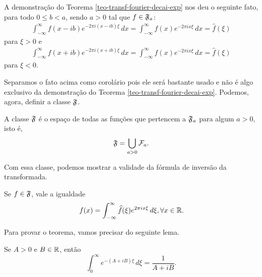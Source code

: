         \begin{corolario}
        \label{transf-fourier-inv-por-shift}
            A demonstração do Teorema \ref{teo-transf-fourier-decai-exp} nos deu o seguinte fato,
            para todo $0\leq b < a$, sendo $a > 0$ tal que $f\in\mathfrak{F}_a$:
            \begin{align*}
                \int_{-\infty}^{\infty} f(x-ib)e^{-2\pi i(x-ib)\xi} \, dx
                =
                \int_{-\infty}^{\infty} f(x)e^{-2\pi ix\xi} \, dx
                =
                \widehat{f}(\xi)
            \end{align*}
            para $\xi > 0$ e
            \begin{align*}
                \int_{-\infty}^{\infty} f(x+ib)e^{-2\pi i(x+ib)\xi} \, dx
                =
                \int_{-\infty}^{\infty} f(x)e^{-2\pi ix\xi} \, dx
                =
                \widehat{f}(\xi)
            \end{align*}
            para $\xi < 0$.
        \end{corolario}
        Separamos o fato acima como corolário pois ele será bastante usado e não é algo exclusivo da
        demonstração do Teorema \ref{teo-transf-fourier-decai-exp}. Podemos, agora, definir a classe
        $\F$.
        \begin{definicao}[Classe $\F$]
        \label{def-classe-F}
            A classe $\F$ é o espaço de todas as funções que pertencem a $\mathfrak{F}_a$
            para algum $a>0$, isto é,
            \begin{equation*}
                \mathfrak{F} = \bigcup_{a>0} \mathcal{F}_a.
            \end{equation*}
        \end{definicao}
        Com essa classe, podemos mostrar a validade da fórmula de inversão da transformada.
        \begin{teorema}
        \label{teo-inv-transf-fourier}
            Se $f\in\mathfrak{F}$, vale a igualdade
            \begin{equation*}
                f(x) = \int_{-\infty}^{\infty} \widehat{f}(\xi) e^{2\pi ix\xi} \, d\xi, \forall x\in\mathbb{R}.
            \end{equation*}
        \end{teorema}
        Para provar o teorema, vamos precisar do seguinte lema.
        \begin{lema}
        \label{lema-int-exp}
            Se $A>0$ e $B\in\mathbb{R}$, então
            \begin{equation*}
                \int_0^{\infty} e^{-(A+iB)\xi} \, d\xi = \frac{1}{A+iB}.
            \end{equation*}
        \end{lema}
